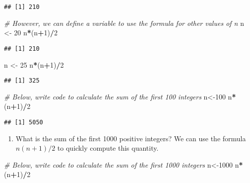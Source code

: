 \documentclass[
]{article}
\newenvironment{Shaded}{\begin{snugshade}}{\end{snugshade}}
\newcommand{\CommentTok}[1]{\textcolor[rgb]{0.56,0.35,0.01}{\textit{#1}}}
\newcommand{\DecValTok}[1]{\textcolor[rgb]{0.00,0.00,0.81}{#1}}
\newcommand{\NormalTok}[1]{#1}
\newcommand{\OperatorTok}[1]{\textcolor[rgb]{0.81,0.36,0.00}{\textbf{#1}}}
\newcommand{\StringTok}[1]{\textcolor[rgb]{0.31,0.60,0.02}{#1}}
\providecommand{\tightlist}{%
  \setlength{\itemsep}{0pt}\setlength{\parskip}{0pt}}
\begin{document}
\begin{verbatim}
## [1] 210
\end{verbatim}

\begin{Shaded}
\begin{Highlighting}[]
\CommentTok{# However, we can define a variable to use the formula for other values of n}
\NormalTok{n <-}\StringTok{ }\DecValTok{20}
\NormalTok{n}\OperatorTok{*}\NormalTok{(n}\OperatorTok{+}\DecValTok{1}\NormalTok{)}\OperatorTok{/}\DecValTok{2}
\end{Highlighting}
\end{Shaded}

\begin{verbatim}
## [1] 210
\end{verbatim}

\begin{Shaded}
\begin{Highlighting}[]
\NormalTok{n <-}\StringTok{ }\DecValTok{25}
\NormalTok{n}\OperatorTok{*}\NormalTok{(n}\OperatorTok{+}\DecValTok{1}\NormalTok{)}\OperatorTok{/}\DecValTok{2}
\end{Highlighting}
\end{Shaded}

\begin{verbatim}
## [1] 325
\end{verbatim}

\begin{Shaded}
\begin{Highlighting}[]
\CommentTok{# Below, write code to calculate the sum of the first 100 integers}
\NormalTok{n<-}\DecValTok{100}
\NormalTok{n}\OperatorTok{*}\NormalTok{(n}\OperatorTok{+}\DecValTok{1}\NormalTok{)}\OperatorTok{/}\DecValTok{2}
\end{Highlighting}
\end{Shaded}

\begin{verbatim}
## [1] 5050
\end{verbatim}

\begin{enumerate}
\def\labelenumi{\arabic{enumi}.}
\setcounter{enumi}{1}
\tightlist
\item
  What is the sum of the first 1000 positive integers? We can use the
  formula \(n(n+1)/2\) to quickly compute this quantity.
\end{enumerate}

\begin{Shaded}
\begin{Highlighting}[]
\CommentTok{# Below, write code to calculate the sum of the first 1000 integers }
\NormalTok{n<-}\DecValTok{1000}
\NormalTok{n}\OperatorTok{*}\NormalTok{(n}\OperatorTok{+}\DecValTok{1}\NormalTok{)}\OperatorTok{/}\DecValTok{2}
\end{Highlighting}
\end{Shaded}
\end{document}

